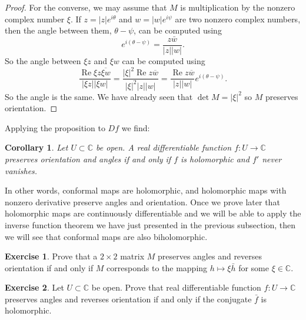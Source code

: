 \documentclass[12pt,openany]{book}
\renewcommand{\Re}{\operatorname{Re}}
\newcommand{\sabs}[1]{\lvert {#1} \rvert}
\newcommand{\C}{{\mathbb{C}}}
\theoremstyle{plain}
\newtheorem{cor}[thm]{Corollary}
\theoremstyle{remark}
\theoremstyle{definition}
\newenvironment{exbox}{%
    \def\FrameCommand{\vrule width 1pt \relax\hspace{10pt}}%
    \MakeFramed{\advance\hsize-\width\FrameRestore}%
}{%
    \endMakeFramed
}
\theoremstyle{exercise}
\newtheorem{exercise}{Exercise}[section]
\theoremstyle{example}
\begin{document}
\begin{proof}
For the converse, we may assume that $M$ is multiplication by the
nonzero complex number $\xi$.
If $z = \sabs{z} e^{i\theta}$ and $w = \sabs{w} e^{i\psi}$ are two nonzero
complex numbers, then the angle between them, $\theta-\psi$, can be
computed using
\begin{equation*}
e^{i(\theta-\psi)}
=
\frac{z\bar{w}}{\sabs{z}\sabs{w}} .
\end{equation*}
So the angle between 
$\xi z$ and $\xi w$ can be computed using
\begin{equation*}
\frac{\Re \xi z\overline{\xi w}}{\sabs{\xi z}\sabs{\xi w}} 
=
\frac{\sabs{\xi}^2 \Re z\overline{w}}{\sabs{\xi}^2 \sabs{z}\sabs{w}} 
=
\frac{\Re z\overline{w}}{\sabs{z}\sabs{w}} e^{i(\theta-\psi)}.
\end{equation*}
So the angle is the same.  We have already seen that $\det M =
\sabs{\xi}^2$ so $M$ preserves orientation.
\end{proof}

Applying the proposition to $Df$ we find:

\begin{cor}
Let $U \subset \C$ be open.
A real differentiable function $f \colon U \to \C$
preserves orientation and angles
if and only if $f$ is holomorphic and $f'$ never vanishes.
\end{cor}

In other words, conformal maps are holomorphic, and holomorphic
maps with nonzero derivative preserve angles and orientation.
Once we prove later that
holomorphic maps are continuously differentiable and we will be able to
apply the inverse function theorem we have just presented in the previous
subsection, then we will see that conformal maps are also biholomorphic.

\begin{exbox}
\begin{exercise}
Prove that a $2 \times 2$ matrix $M$ preserves angles and reverses
orientation if and only if $M$ corresponds to the mapping $h \mapsto \xi
\bar{h}$ for some $\xi \in \C$.
\end{exercise}

\begin{exercise}
Let $U \subset \C$ be open.
Prove that real differentiable function $f \colon U \to \C$ preserves angles
and reverses orientation if and only if the conjugate $\bar{f}$ is
holomorphic.
\end{exercise}
\end{exbox}

\end{document}
